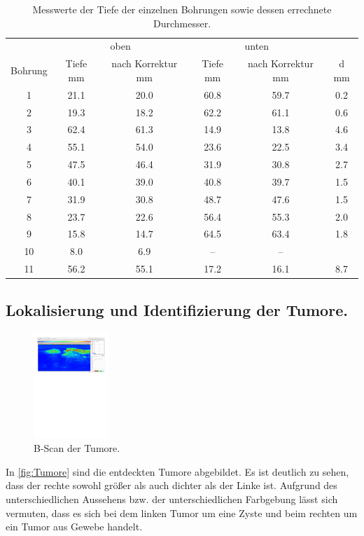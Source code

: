 \begin{table}
    \centering 
    \caption{Messwerte der Tiefe der einzelnen Bohrungen sowie dessen errechnete Durchmesser.}
\begin{tabular}{c | c c | c c | c}
    \toprule
    & \multicolumn{2}{c}{oben}& \multicolumn{2}{c}{unten} & \\
    Bohrung & Tiefe \/\unit{\mm} &  nach Korrektur \/\unit{\mm}& Tiefe \/ \unit{\mm} & nach Korrektur \/ \unit{\mm} & d \/ \unit{\mm}\\
    \midrule
           1 & 21.1 & 20.0 & 60.8 & 59.7 & 0.2\\
           2 & 19.3 & 18.2 & 62.2 & 61.1 & 0.6\\
           3 & 62.4 & 61.3 & 14.9 & 13.8 & 4.6\\
           4 & 55.1 & 54.0 & 23.6 & 22.5 & 3.4\\
           5 & 47.5 & 46.4 & 31.9 & 30.8 & 2.7\\
           6 & 40.1 & 39.0 & 40.8 & 39.7 & 1.5\\
           7 & 31.9 & 30.8 & 48.7 & 47.6 & 1.5\\
           8 & 23.7 & 22.6 & 56.4 & 55.3 & 2.0\\
           9 & 15.8 & 14.7 & 64.5 & 63.4 & 1.8\\
           10& 8.0  & 6.9  & -- & -- &     \\
           11& 56.2 & 55.1 & 17.2 & 16.1 & 8.7\\
    \bottomrule
    \end{tabular}
    \label{tab:AScan}
\end{table}

\subsection{Lokalisierung und Identifizierung der Tumore.}
\begin{figure}
    \centering
    \includegraphics[height = 4cm]{vier.pdf}
    \caption{B-Scan der Tumore.}
    \label{fig:Tumore}
\end{figure}
In \autoref{fig:Tumore} sind die entdeckten Tumore abgebildet. Es ist deutlich zu sehen, dass der rechte sowohl größer als auch dichter als der Linke ist. Aufgrund des unterschiedlichen Aussehens bzw. der
unterschiedlichen Farbgebung lässt sich vermuten, dass es sich bei dem linken Tumor um eine Zyste und beim rechten um ein Tumor aus Gewebe handelt.